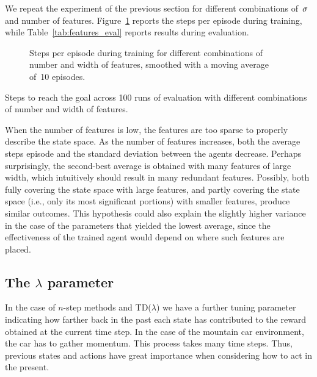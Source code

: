 We repeat the experiment of the previous section for different combinations of~$\sigma$ and number of features. Figure~\ref{fig:features_steps} reports the steps per episode during training, while Table~\ref{tab:features_eval} reports results during evaluation.
\begin{figure}
\centering

\caption{Steps per episode during training for different combinations of number and width of features, smoothed with a moving average of~10 episodes.}
\label{fig:features_steps}
\end{figure}
\begin{table}[ht]
\centering
{}
\caption{Steps to reach the goal across 100 runs of evaluation with different combinations of number and width of features.}
\label{tab:features_eval}
\end{table}
When the number of features is low, the features are too sparse to properly describe the state space. As the number of features increases, both the average steps episode and the standard deviation between the agents decrease. Perhaps surprisingly, the second-best average is obtained with many features of large width, which intuitively should result in many redundant features. Possibly, both fully covering the state space with large features, and partly covering the state space (i.e., only its most significant portions) with smaller features, produce similar outcomes. This hypothesis could also explain the slightly higher variance in the case of the parameters that yielded the lowest average, since the effectiveness of the trained agent would depend on where such features are placed.

\subsection{The \texorpdfstring{${\lambda}$}{lambda} parameter}
In the case of $n$-step methods and TD($\lambda$) we have a further tuning parameter indicating how farther back in the past each state has contributed to the reward obtained at the current time step. In the case of the mountain car environment, the car has to gather momentum. This process takes many time steps. Thus, previous states and actions have great importance when considering how to act in the present.

